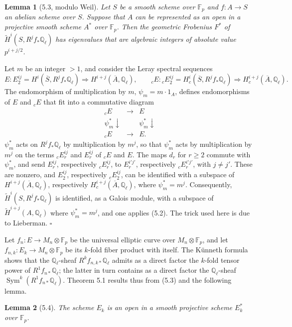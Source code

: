 \documentclass[10pt]{article}
\newcommand{\F}{\mathbb F}
\newcommand{\Q}{\mathbb Q}
\newcommand{\Sym}{\operatorname{Sym}}
\newcommand{\QED}{\hfill$\square$}
\newtheorem*{lemma}{Lemma}
\begin{document}
\begin{lemma}[5.3, modulo Weil]
Let $S$ be a smooth scheme over $\F_p$ and $f:A\to S$ an abelian scheme over $S$. Suppose that $A$ can be represented as an open in a projective smooth scheme $A^*$ over $\F_p$. Then the geometric Frobenius $F^*$ of $\widetilde H^i(S,R^jf_*\Q_\ell)$ has eigenvalues that are algebraic integers of absolute value $p^{i+j/2}$.
\end{lemma}

Let $m$ be an integer $>1$, and consider the Leray spectral sequences
\[
E:
E_2^{ij}=H^i(\overline S,R^jf_*\Q_\ell)\Longrightarrow H^{i+j}(\overline A,\Q_\ell),
\qquad
{}_cE:
{}_cE_2^{ij}=H_c^i(\overline S,R^jf_*\Q_\ell)\Longrightarrow H_c^{i+j}(\overline A,\Q_\ell).
\]
The endomorphism of multiplication by $m$, $\psi_m=m\cdot 1_A$, defines endomorphisms of $E$ and ${}_cE$ that fit into a commutative diagram
\[
\begin{array}{ccc}
{}_cE&\longrightarrow&E\\
\psi_m^*\downarrow&&\psi_m^*\downarrow\\
{}_cE&\longrightarrow&E.
\end{array}
\]
$\psi_m^*$ acts on $R^jf_*\Q_\ell$ by multiplication by $m^j$, so that $\psi_m^*$ acts by multiplication by $m^j$ on the terms ${}_cE_r^{ij}$ and $E_r^{ij}$ of ${}_cE$ and $E$. The maps $d_r$ for $r\ge 2$ commute with $\psi_m^*$, and send $E_r^{ij}$, respectively ${}_cE_r^{ij}$, to $E_r^{i'j'}$, respectively ${}_cE_r^{i'j'}$, with $j\ne j'$. These are nonzero, and $E_2^{ij}$, respectively ${}_cE_2^{ij}$, can be identified with a subspace of $H^{i+j}(\overline A,\Q_\ell)$, respectively $H_c^{i+j}(\overline A,\Q_\ell)$, where $\psi_m^*=m^j$. Consequently, $\widetilde H^i(S,R^jf_*\Q_\ell)$ is identified, as a Galois module, with a subspace of $\widetilde H^{i+j}(A,\Q_\ell)$ where $\psi_m^*=m^j$, and one applies (5.2). The trick used here is due to Lieberman. \QED

Let $f_n:E\to M_n\otimes\F_p$ be the universal elliptic curve over $M_n\otimes\F_p$, and let $f_{n,k}:E_k\to M_n\otimes\F_p$ be its $k$-fold fiber product with itself. The Künneth formula shows that the $\Q_\ell$-sheaf $R^kf_{n,k*}\Q_\ell$ admits as a direct factor the $k$-fold tensor power of $R^1f_{n*}\Q_\ell$; the latter in turn contains as a direct factor the $\Q_\ell$-sheaf $\Sym^k(R^1f_{n*}\Q_\ell)$. Theorem 5.1 results thus from (5.3) and the following lemma.

\begin{lemma}[5.4]
The scheme $E_k$ is an open in a smooth projective scheme $E_k^*$ over $\F_p$.
\end{lemma}
\end{document}
